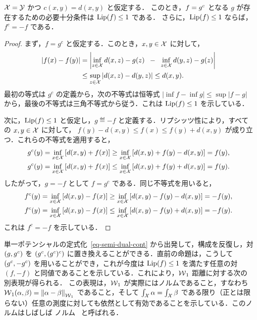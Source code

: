 \begin{prop}$\mathcal{X}=\mathcal{Y}$ かつ $c(x,y)=d(x,y)$ と仮定する．
このとき，$f = g^c$ となる $g$ が存在するための必要十分条件は $\operatorname{Lip}(f) \leq 1$ である．
さらに，$\operatorname{Lip}(f)\leq1$ ならば，$f^c=-f$ である．
\end{prop}

\begin{proof}
まず，$f=g^c$ と仮定する．このとき，$x,y\in \mathcal{X}$ に対して，
\begin{align*}
|f(x)-f(y)|&=\left|\inf_{z\in\mathcal{X}} d(x,z)-g(z) \;\; - \;\;\inf_{z\in \mathcal{X}} d(y,z)-g(z) \right|\\
&\leq \sup_{z\in\mathcal{X}} |d(x,z)-d(y,z)|\leq d(x,y).
\end{align*}
最初の等式は $g^c$ の定義から，次の不等式は恒等式 $|\inf f-\inf g|\leq\sup|f-g|$ から，最後の不等式は三角不等式から従う．これは $\operatorname{Lip}(f)\leq1$ を示している．

次に，$\operatorname{Lip}(f)\leq1$ と仮定し，$g\eqdef -f$ と定義する．リプシッツ性により，すべての $x,y\in\mathcal{X}$ に対して，
$f(y)-d(x,y)\leq f(x)\leq f(y)+d(x,y)$ が成り立つ．これらの不等式を適用すると，
\begin{align*}
g^c(y)&=\inf_{x\in\mathcal{X}}\left[ d(x,y) + f(x) \right]
\geq\inf_{x\in \mathcal{X}} \left[  d(x,y)+f(y)-d(x,y)\right]=f(y),\\
g^c(y)&=\inf_{x\in\mathcal{X}}\left[ d(x,y) + f(x) \right]
\leq \inf_{x\in\mathcal{X}}\left[ d(x,y) + f(y)+d(x,y) \right]=f(y).
\end{align*}
したがって，$g=-f$ として $f=g^c$ である．同じ不等式を用いると，
\begin{align*}
f^c(y)&=\inf_{x\in\mathcal{X}}\left[ d(x,y) - f(x) \right]
\geq\inf_{x\in \mathcal{X}} \left[  d(x,y)-f(y)-d(x,y)\right]=-f(y),\\
f^c(y)&=\inf_{x\in\mathcal{X}}\left[ d(x,y) - f(x) \right]
\leq \inf_{x\in\mathcal{X}}\left[ d(x,y) - f(y)+d(x,y) \right]=-f(y).
\end{align*}
これは $f^c=-f$ を示している．
\end{proof}

単一ポテンシャルの定式化~\eqref{eq-semi-dual-cont} から出発して，構成を反復し，対 $(g,g^c)$ を $(g^c,(g^c)^c)$ に置き換えることができる．直前の命題は，こうして $(g^c,-g^c)$ を用いることができ，これが今度は $\operatorname{Lip}(f) \leq 1$ を満たす任意の対 $(f,-f)$ と同値であることを示している．これにより，$\operatorname{\mathcal{W}}_1$ 距離に対する次の別表現が得られる．
この表現は，$\operatorname{\mathcal{W}}_1$ が実際にはノルムであること，すなわち $\operatorname{\mathcal{W}}_1(\alpha,\beta) = \left\| \alpha-\beta \right\|_{\operatorname{\mathcal{W}}_1}$ であること，そして $\int_{\mathcal{X}} \alpha=\int_{\mathcal{X}} \beta$ である限り（正とは限らない）任意の測度に対しても依然として有効であることを示している．このノルムはしばしば \citeauthor{kantorovich1958space} ノルム~\citeyearpar{kantorovich1958space} と呼ばれる．

